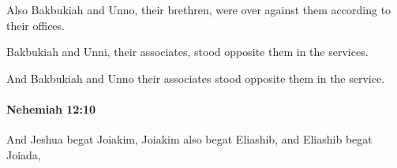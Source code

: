 			\begin{versebox}
					\item[BHS] 
					\item[ASV] Also Bakbukiah and Unno, their brethren, were over against them according to their offices.
					\item[NIV] Bakbukiah and Unni, their associates, stood opposite them in the services.
					\item[NRSV] And Bakbukiah and Unno their associates stood opposite them in the service.
			\end{versebox}

		\paragraph{Nehemiah 12:10} %
			\label{NEHEMIAH-12-10}

			And Jeshua begat Joiakim, Joiakim also begat Eliashib, and Eliashib begat Joiada,

